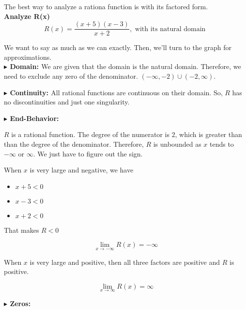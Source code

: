 \documentclass{ximera}
\author{Lee Wayand}
\begin{document}
\begin{exercise}



The best way to analyze a rationa function is with its factored form. \\


\textbf{Analyze R(x)} \\

\[
R(x) = \frac{(x+5)(x-3)}{x+2}, \text { with its natural domain } 
\]




We want to say as much as we can exactly.  Then, we'll turn to the graph for approximations. \\






\textbf{\textcolor{blue!55!black}{$\blacktriangleright$ Domain: }} We are given that the domain is the natural domain. Therefore, we need to exclude any zero of the denominator. $(-\infty, -2) \cup (-2, \infty)$.


\textbf{\textcolor{blue!55!black}{$\blacktriangleright$ Continuity: }}  All rational functions are continuous on their domain.  So, $R$ has no discontinuities and just one singularity.




\textbf{\textcolor{blue!55!black}{$\blacktriangleright$ End-Behavior: }} 


$R$ is a rational function. The degree of the numerator is $2$, which is greater than than the degree of the denominator.  Therefore, $R$ is unbounded as $x$ tends to $-\infty$ or $\infty$.  We just have to figure out the sign.


When $x$ is very large and negative, we have 

\begin{itemize}
\item $x+5 < 0$
\item $x-3 < 0$
\item $x+2 < 0$
\end{itemize}


That makes $R < 0$

\[
\lim\limits_{x \to -\infty} R(x) = -\infty
\]


When $x$ is very large and positive, then all three factors are positive and $R$ is positive.


\[
\lim\limits_{x \to \infty} R(x) = \infty
\]





\textbf{\textcolor{blue!55!black}{$\blacktriangleright$ Zeros: }}  



\end{exercise}
\end{document}
